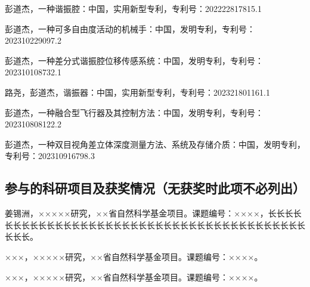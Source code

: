 \begin{resume}
  \begin{achievements}
    \item 彭道杰，一种谐振腔：中国，实用新型专利，专利号：202222817815.1
    \item 彭道杰，一种可多自由度活动的机械手：中国，发明专利，专利号：202310229097.2
    \item 彭道杰，一种差分式谐振腔位移传感系统：中国，发明专利，专利号：202310108732.1
    \item 路尧，彭道杰，谐振器：中国，实用新型专利，专利号：202321801161.1
    \item 彭道杰，一种融合型飞行器及其控制方法：中国，发明专利，专利号：202310808122.2
    \item 彭道杰，一种双目视角差立体深度测量方法、系统及存储介质：中国，发明专利，专利号：202310916798.3
  \end{achievements}

  \subsection*{参与的科研项目及获奖情况（无获奖时此项不必列出）}
  \begin{achievements}
    \item 姜锡洲，×××××研究，××省自然科学基金项目。课题编号：××××，长长长长长长长长长长长长长长长长长长长长长长长长长长长长长长长长长长长长长长长长长长长。
    \item ×××，×××××研究，××省自然科学基金项目。课题编号：××××。
    \item ×××，×××××研究，××省自然科学基金项目。课题编号：××××。
  \end{achievements}

\end{resume}
